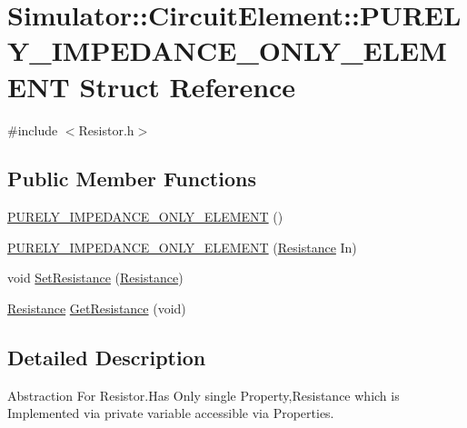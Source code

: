 \hypertarget{struct_simulator_1_1_circuit_element_1_1_p_u_r_e_l_y___i_m_p_e_d_a_n_c_e___o_n_l_y___e_l_e_m_e_n_t}{}\section{Simulator\+:\+:Circuit\+Element\+:\+:P\+U\+R\+E\+L\+Y\+\_\+\+I\+M\+P\+E\+D\+A\+N\+C\+E\+\_\+\+O\+N\+L\+Y\+\_\+\+E\+L\+E\+M\+E\+N\+T Struct Reference}
\label{struct_simulator_1_1_circuit_element_1_1_p_u_r_e_l_y___i_m_p_e_d_a_n_c_e___o_n_l_y___e_l_e_m_e_n_t}


{\ttfamily \#include $<$Resistor.\+h$>$}

\subsection*{Public Member Functions}
\begin{DoxyCompactItemize}
\item 
\hyperlink{struct_simulator_1_1_circuit_element_1_1_p_u_r_e_l_y___i_m_p_e_d_a_n_c_e___o_n_l_y___e_l_e_m_e_n_t_a476e7eb6507428b158bae00611e2e48a}{P\+U\+R\+E\+L\+Y\+\_\+\+I\+M\+P\+E\+D\+A\+N\+C\+E\+\_\+\+O\+N\+L\+Y\+\_\+\+E\+L\+E\+M\+E\+N\+T} ()
\item 
\hyperlink{struct_simulator_1_1_circuit_element_1_1_p_u_r_e_l_y___i_m_p_e_d_a_n_c_e___o_n_l_y___e_l_e_m_e_n_t_a39843b54eb1f8788463f170c3bafb8eb}{P\+U\+R\+E\+L\+Y\+\_\+\+I\+M\+P\+E\+D\+A\+N\+C\+E\+\_\+\+O\+N\+L\+Y\+\_\+\+E\+L\+E\+M\+E\+N\+T} (\hyperlink{_resistor_8h_a26699b48da404a64e66bf5db8e1b4ab3}{Resistance} In)
\item 
void \hyperlink{struct_simulator_1_1_circuit_element_1_1_p_u_r_e_l_y___i_m_p_e_d_a_n_c_e___o_n_l_y___e_l_e_m_e_n_t_a5e772f4bd081189aace3e807f4c81eb8}{Set\+Resistance} (\hyperlink{_resistor_8h_a26699b48da404a64e66bf5db8e1b4ab3}{Resistance})
\item 
\hyperlink{_resistor_8h_a26699b48da404a64e66bf5db8e1b4ab3}{Resistance} \hyperlink{struct_simulator_1_1_circuit_element_1_1_p_u_r_e_l_y___i_m_p_e_d_a_n_c_e___o_n_l_y___e_l_e_m_e_n_t_a77ccc0c5335c06d1f485943946cf24a3}{Get\+Resistance} (void)
\end{DoxyCompactItemize}


\subsection{Detailed Description}
Abstraction For Resistor.\+Has Only single Property,Resistance which is Implemented via private variable accessible via Properties. 

